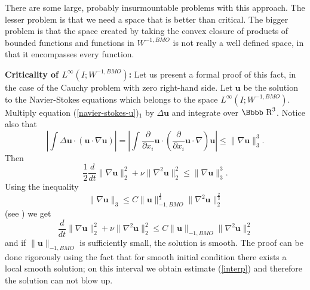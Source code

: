\documentclass[12pt,twoside]{article}
\newcommand {\rdd}{\mbox{\Bbbb R}}
\newcommand {\bu}{{\mathbf{u}}}
\begin{document}
There are some large, probably insurmountable problems with this approach.
The lesser problem is that we need a space that is better than critical.
The bigger problem is that the space created by taking the convex closure
of products of bounded
functions and functions in $W^{-1,BMO}$ is not really a well defined
space, in that it encompasses every function.

{\bf Criticality of $L^{\infty}(I; W^{-1,BMO})$:} Let us present a
formal proof of this fact, in the case of the Cauchy problem with zero
right-hand side.
Let $\bu$ be the solution to the Navier-Stokes
equations which belongs to the space $L^{\infty}(I;
W^{-1,BMO})$. Multiply equation (\ref{navier-stokes-u})$_1$ by $\Delta
\bu$ and integrate over $\rdd^3$. Notice also that
$$
\left| \int \Delta \bu \cdot (\bu \cdot \nabla \bu) \right| =
\left|\int \frac\partial{\partial x_i} \bu \cdot 
 \left(\frac\partial{\partial x_i} \bu \cdot \nabla \right)\bu\right|
\le \| \nabla \bu \|_3^3 . $$
Then
$$
\frac 12 \frac{d}{dt} \|\nabla \bu\|_2^2 + \nu \|\nabla ^2 \bu\|_2^2
\leq \| \nabla \bu \|_3^3 .
$$
Using the inequality
$$
\|\nabla \bu\|_3 \leq C \|\bu\|_{-1,BMO}^{\frac 13} \|\nabla^2 \bu\|_2^{\frac 23}
$$
(see \cite{Oru}) we get
\begin{equation}
\label{interp}
 \frac{d}{dt} \|\nabla \bu\|_2^2 + \nu \|\nabla ^2 \bu\|_2^2
 \leq
 C \|\bu\|_{-1,BMO} \|\nabla^2 \bu\|_2^2     
\end{equation}
and if $\|\bu\|_{-1,BMO}$ is sufficiently small, the solution is
smooth.
The proof can be done rigorously using the fact that for smooth
initial condition there exists a local smooth solution; on this
interval we obtain estimate (\ref{interp}) and therefore the solution
can not blow up.
\end{document}
